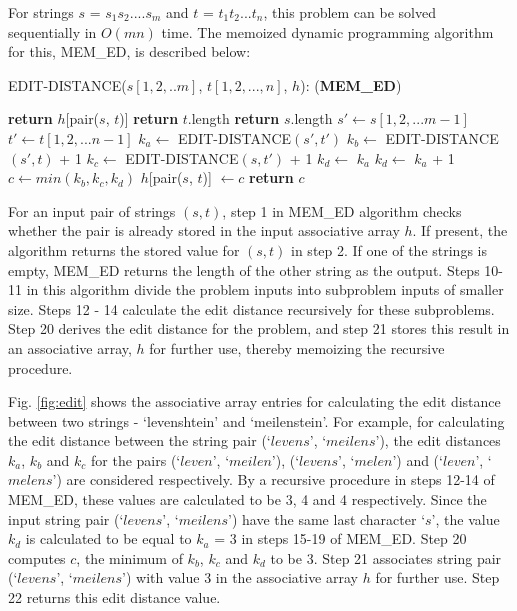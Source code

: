 \documentclass[conference]{IEEEtran}
\begin{document}
For strings $s$ = $s_1s_2....s_m$ and $t$ = $t_1t_2...t_n$, this problem can be solved sequentially in $O(mn)$ time. The memoized dynamic programming algorithm for this, MEM\_ED, is described below:

\begin{algorithm}
\caption{EDIT-DISTANCE($s[1,2,..m]$, $t[1,2,...,n]$, $h$): (\textbf{MEM\_ED})}
\begin{algorithmic}[1]
    \State \textbf{return} $h$[pair($s$, $t$)]
\EndIf
{}
    \State \textbf{return} $t$.length
\EndIf
{}
    \State \textbf{return} $s$.length
\EndIf
\State $s' \leftarrow s[1,2,...m-1]$
\State $t' \leftarrow t[1,2,...n-1]$
\State $k_a \leftarrow$ EDIT-DISTANCE$(s', t')$
\State $k_b \leftarrow$ EDIT-DISTANCE$(s', t)$ + 1
\State $k_c \leftarrow$ EDIT-DISTANCE$(s, t')$ + 1
    \State $k_d \leftarrow$ $k_a$
\Else
    \State $k_d \leftarrow$ $k_a$ + 1
\EndIf
\State $c \leftarrow min(k_b, k_c, k_d)$
\State $h$[pair($s$, $t$)] $\leftarrow c$
\State \textbf{return} $c$
\end{algorithmic}
\end{algorithm}

For an input pair of strings $(s, t)$, step 1 in MEM\_ED algorithm checks whether the pair is already stored in the input associative array $h$. If present, the algorithm returns the stored value for $(s, t)$ in step 2. If one of the strings is empty, MEM\_ED returns the length of the other string as the output. Steps 10-11 in this algorithm divide the problem inputs into subproblem inputs of smaller size. Steps 12 - 14 calculate the edit distance recursively for these subproblems. Step 20 derives the edit distance for the problem, and step 21 stores this result in an associative array, $h$  for further use, thereby memoizing the recursive procedure. 

Fig. \ref{fig:edit} shows the associative array entries for calculating the edit distance between two strings - `levenshtein' and `meilenstein'. For example, for calculating the edit distance between the string pair (`$levens$', `$meilens$'), the edit distances $k_a$, $k_b$ and $k_c$ for the pairs (`$leven$', `$meilen$'), (`$levens$', `$melen$') and (`$leven$', `$melens$') are considered respectively. By a recursive procedure in steps 12-14 of MEM\_ED, these values are calculated to be 3, 4 and 4 respectively. Since the input string pair (`$levens$', `$meilens$') have the same last character `$s$', the value $k_d$ is calculated to be equal to $k_a$ = 3 in steps 15-19 of MEM\_ED. Step 20 computes $c$, the minimum of $k_b$, $k_c$ and $k_d$ to be 3. Step 21 associates string pair (`$levens$', `$meilens$') with value 3 in the associative array $h$ for further use. Step 22 returns this edit distance value.
\end{document}
